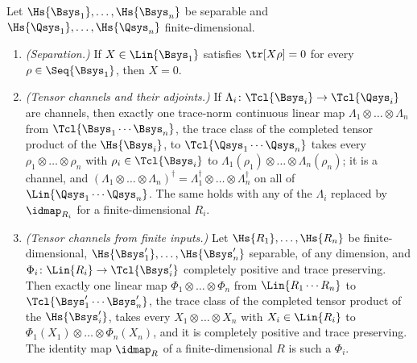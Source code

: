 \begin{lemma}
Let $\Hs{\Bsys_1},\dots,\Hs{\Bsys_n}$ be separable and
$\Hs{\Qsys_1},\dots,\Hs{\Qsys_n}$ finite-dimensional.
\begin{enumerate}[label=(\roman*),leftmargin=3.0em]
\item \emph{(Separation.)} If $X\in\Lin{\Bsys_1}$ satisfies $\tr[X\rho]=0$ for
  every $\rho\in\Seq{\Bsys_1}$, then $X=0$.
\item \emph{(Tensor channels and their adjoints.)} If $\Lambda_i\colon
  \Tcl{\Bsys_i}\to\Tcl{\Qsys_i}$ are channels, then exactly one trace-norm
  continuous linear map $\Lambda_1\otimes\dots\otimes\Lambda_n$ from
  $\Tcl{\Bsys_1\cdots\Bsys_n}$, the trace class of the completed tensor
  product of the $\Hs{\Bsys_i}$, to $\Tcl{\Qsys_1\cdots\Qsys_n}$ takes every
  $\rho_1\otimes\dots\otimes\rho_n$ with $\rho_i\in\Tcl{\Bsys_i}$ to
  $\Lambda_1(\rho_1)\otimes\dots\otimes\Lambda_n(\rho_n)$; it is a channel,
  and $(\Lambda_1\otimes\dots\otimes\Lambda_n)^{\dagger}
  =\Lambda_1^{\dagger}\otimes\dots\otimes\Lambda_n^{\dagger}$ on all of
  $\Lin{\Qsys_1\cdots\Qsys_n}$. The same holds with any of the $\Lambda_i$
  replaced by $\idmap_{R_i}$ for a finite-dimensional $R_i$.
\item \emph{(Tensor channels from finite inputs.)} Let
  $\Hs{R_1},\dots,\Hs{R_n}$ be finite-dimensional,
  $\Hs{\Bsys'_1},\dots,\Hs{\Bsys'_n}$ separable, of any dimension, and
  $\Phi_i\colon\Lin{R_i}\to\Tcl{\Bsys'_i}$ completely positive and trace
  preserving. Then exactly one linear map $\Phi_1\otimes\dots\otimes\Phi_n$
  from $\Lin{R_1\cdots R_n}$ to $\Tcl{\Bsys'_1\cdots\Bsys'_n}$, the trace
  class of the completed tensor product of the $\Hs{\Bsys'_i}$, takes every
  $X_1\otimes\dots\otimes X_n$ with $X_i\in\Lin{R_i}$ to
  $\Phi_1(X_1)\otimes\dots\otimes\Phi_n(X_n)$, and it is completely positive
  and trace preserving. The identity map $\idmap_{R}$ of a finite-dimensional
  $R$ is such a $\Phi_i$.
\end{enumerate}
\end{lemma}

